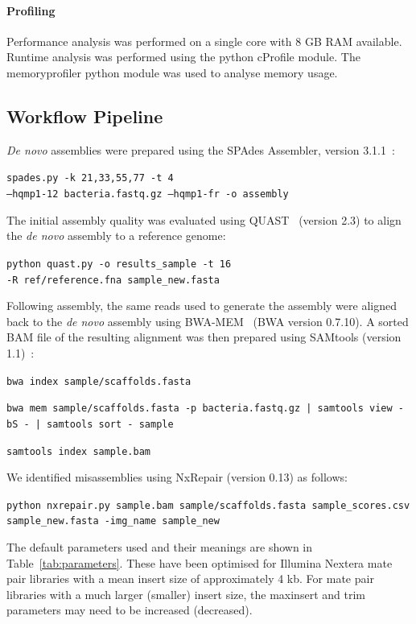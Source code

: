 \paragraph{Profiling}
Performance analysis was performed on a single core with 8 GB RAM available. Runtime analysis was performed using the python cProfile module. The memoryprofiler python module was used to analyse memory usage.

\subsection{Workflow Pipeline}
\textit{De novo} assemblies were prepared using the SPAdes Assembler, version 3.1.1~\cite{Bankevich2012}:

\texttt{spades.py -k 21,33,55,77 -t 4 \\ --hqmp1-12 bacteria.fastq.gz  --hqmp1-fr -o assembly}

The initial assembly quality was evaluated using QUAST~\cite{Gurevich2013} (version 2.3) to align the \textit{de novo} assembly to a reference genome:

\texttt{python quast.py -o results\_sample -t 16 \\  -R ref/reference.fna sample\_new.fasta }

  Following assembly, the same reads used to generate the assembly were aligned back to the \textit{de novo} assembly using BWA-MEM~\cite{li2013} (BWA version 0.7.10). A sorted BAM file of the resulting alignment was then prepared using SAMtools (version 1.1)~\cite{li2009}: 

\texttt{bwa index sample/scaffolds.fasta}

\texttt{bwa mem sample/scaffolds.fasta -p bacteria.fastq.gz | samtools view -bS - |  samtools sort - sample}

\texttt{samtools index sample.bam}

We identified misassemblies using NxRepair (version 0.13) as follows:

\texttt{python nxrepair.py sample.bam   sample/scaffolds.fasta sample\_scores.csv  sample\_new.fasta -img\_name sample\_new}


The default parameters used and their meanings are shown in Table~\ref{tab:parameters}. These have been optimised for Illumina Nextera mate pair libraries with a mean insert size of approximately 4 kb. For mate pair libraries with a much larger (smaller) insert size, the maxinsert and trim parameters may need to be increased (decreased).

